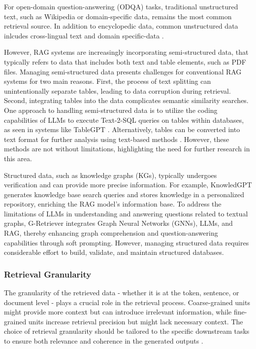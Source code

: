 For open-domain question-answering (ODQA) tasks, traditional unstructured text, such as Wikipedia or domain-specific data, remains the most common retrieval source. In addition to encyclopedic data, common unstructured data inlcudes cross-lingual text and domain specific-data \cite{li2023classification}.

However, RAG systems are increasingly incorporating semi-structured data, that typically refers to data that includes both text and table elements, such as PDF files. Managing semi-structured data presents challenges for conventional RAG systems for two main reasons. First, the process of text splitting can unintentionally separate tables, leading to data corruption during retrieval. Second, integrating tables into the data complicates semantic similarity searches. One approach to handling semi-structured data is to utilize the coding capabilities of LLMs to execute Text-2-SQL queries on tables within databases, as seen in systems like TableGPT \cite{zha2023tablegpt}. Alternatively, tables can be converted into text format for further analysis using text-based methods \cite{luo2023augmented}. However, these methods are not without limitations, highlighting the need for further research in this area.

Structured data, such as knowledge graphs (KGs), typically undergoes verification and can provide more precise information. For example, KnowledGPT \cite{wang2023knowledgpt} generates knowledge base search queries and stores knowledge in a personalized repository, enriching the RAG model’s information base. To address the limitations of LLMs in understanding and answering questions related to textual graphs, G-Retriever \cite{he2024g} integrates Graph Neural Networks (GNNs), LLMs, and RAG, thereby enhancing graph comprehension and question-answering capabilities through soft prompting. However, managing structured data requires considerable effort to build, validate, and maintain structured databases.

\subsubsection{Retrieval Granularity}

The granularity of the retrieved data - whether it is at the token, sentence, or document level - plays a crucial role in the retrieval process. Coarse-grained units might provide more context but can introduce irrelevant information, while fine-grained units increase retrieval precision but might lack necessary context. The choice of retrieval granularity should be tailored to the specific downstream tasks to ensure both relevance and coherence in the generated outputs \cite{gao2023retrieval}.

